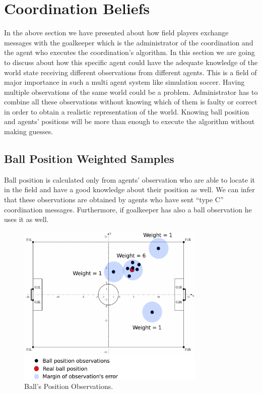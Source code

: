 \section{Coordination Beliefs}
In the above section we have presented about how field players exchange messages with the goalkeeper which is the administrator of the coordination and the agent who executes the coordination's algorithm. In this section we are going to discuss about how this specific agent could have the adequate knowledge of the world state receiving different observations from different agents. This is a field of major importance in such a multi agent system like simulation soccer. Having multiple observations of the same world could be a problem. Administrator has to combine all these observations without knowing which of them is faulty or correct in order to obtain a realistic representation of the world. Knowing ball position and agents' positions will be more than enough to execute the algorithm without making guesses.

\subsection{Ball Position Weighted Samples}
Ball position is calculated only from agents' observation who are able to locate it in the field and have a good knowledge about their position as well. We can infer that these observations are obtained by agents who have sent ``type C'' coordination messages. Furthermore, if goalkeeper has also a ball observation he uses it as well.

\begin{figure}[t!]
\centering
  \includegraphics[width=0.8\textwidth]{Chapter4/figures/Ball.pdf}
  \caption{Ball's Position Observations.} 
  \label{fig:Ball}
\end{figure}


